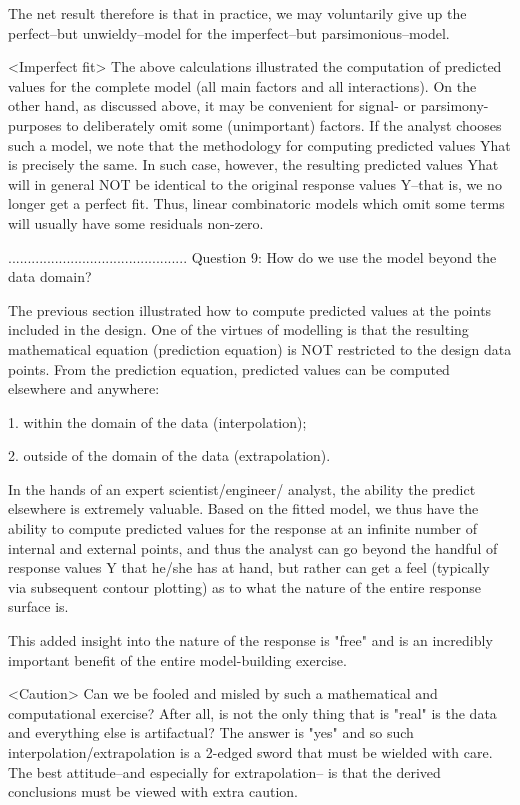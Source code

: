 The net result therefore is that in practice, we
may voluntarily give up the perfect--but
unwieldy--model for the imperfect--but
parsimonious--model.

<Imperfect fit>
The above calculations illustrated the computation
of predicted values for the complete model (all
main factors and all interactions).  On the other
hand, as discussed above, it may be convenient for
signal- or parsimony- purposes to deliberately
omit some (unimportant) factors.  If the analyst
chooses such a model, we note that the methodology
for computing predicted values Yhat is precisely
the same.  In such case, however, the resulting
predicted values Yhat will in general NOT be
identical to the original response values Y--that
is, we no longer get a perfect fit.  Thus, linear
combinatoric models which omit some terms will
usually have some residuals non-zero.

..............................................
Question 9: How do we use the model beyond the
            data domain?

The previous section illustrated how to compute
predicted values at the points included in the
design.  One of the virtues of modelling is that
the resulting mathematical equation (prediction
equation) is NOT restricted to the design data
points.  From the prediction equation, predicted
values can be computed elsewhere and anywhere:

   1. within the domain of the data (interpolation);

   2. outside of the domain of the data (extrapolation).

In the hands of an expert scientist/engineer/
analyst, the ability the predict elsewhere is
extremely valuable.  Based on the fitted model, we
thus have the ability to compute predicted values
for the response at an infinite number of
internal and external points, and thus the analyst
can go beyond the handful of response values Y
that he/she has at hand, but rather can get a feel
(typically via subsequent contour plotting) as to
what the nature of the entire response surface is.

This added insight into the nature of the response
is "free" and is an incredibly important benefit
of the entire model-building exercise.

<Caution>
Can we be fooled and misled by such a mathematical
and computational exercise?  After all, is not the
only thing that is "real" is the data and
everything else is artifactual?  The answer is
"yes" and so such interpolation/extrapolation is a
2-edged sword that must be wielded with care.  The
best attitude--and especially for extrapolation--
is that the derived conclusions must be viewed
with extra caution.

